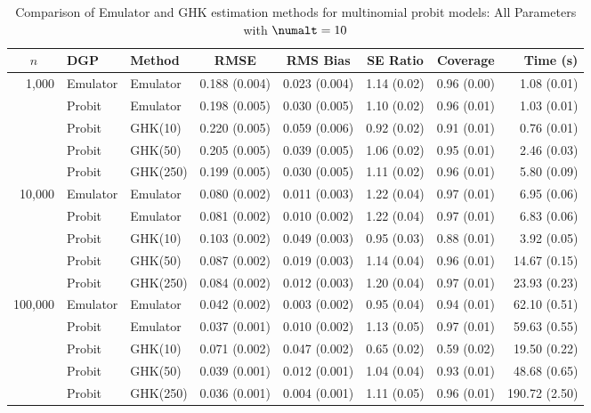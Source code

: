 \begin{table}[htbp]
\centering
\footnotesize
\begin{tabular}{@{}rllrrrrr@{}}
\toprule
\multicolumn{1}{c}{$n$} & \multicolumn{1}{l}{DGP} & \multicolumn{1}{l}{Method} & \multicolumn{1}{c}{RMSE} & \multicolumn{1}{c}{RMS Bias} & \multicolumn{1}{c}{SE Ratio} & \multicolumn{1}{c}{Coverage} & \multicolumn{1}{r}{Time (s)} \\
\midrule
\multirow{5}{*}{1,000} & Emulator & Emulator & 0.188 (0.004) & 0.023 (0.004) & 1.14 (0.02) & 0.96 (0.00) & 1.08 (0.01) \\
 & Probit & Emulator & 0.198 (0.005) & 0.030 (0.005) & 1.10 (0.02) & 0.96 (0.01) & 1.03 (0.01) \\
 & Probit & GHK(10) & 0.220 (0.005) & 0.059 (0.006) & 0.92 (0.02) & 0.91 (0.01) & 0.76 (0.01) \\
 & Probit & GHK(50) & 0.205 (0.005) & 0.039 (0.005) & 1.06 (0.02) & 0.95 (0.01) & 2.46 (0.03) \\
 & Probit & GHK(250) & 0.199 (0.005) & 0.030 (0.005) & 1.11 (0.02) & 0.96 (0.01) & 5.80 (0.09) \\
\midrule
\multirow{5}{*}{10,000} & Emulator & Emulator & 0.080 (0.002) & 0.011 (0.003) & 1.22 (0.04) & 0.97 (0.01) & 6.95 (0.06) \\
 & Probit & Emulator & 0.081 (0.002) & 0.010 (0.002) & 1.22 (0.04) & 0.97 (0.01) & 6.83 (0.06) \\
 & Probit & GHK(10) & 0.103 (0.002) & 0.049 (0.003) & 0.95 (0.03) & 0.88 (0.01) & 3.92 (0.05) \\
 & Probit & GHK(50) & 0.087 (0.002) & 0.019 (0.003) & 1.14 (0.04) & 0.96 (0.01) & 14.67 (0.15) \\
 & Probit & GHK(250) & 0.084 (0.002) & 0.012 (0.003) & 1.20 (0.04) & 0.97 (0.01) & 23.93 (0.23) \\
\midrule
\multirow{5}{*}{100,000} & Emulator & Emulator & 0.042 (0.002) & 0.003 (0.002) & 0.95 (0.04) & 0.94 (0.01) & 62.10 (0.51) \\
 & Probit & Emulator & 0.037 (0.001) & 0.010 (0.002) & 1.13 (0.05) & 0.97 (0.01) & 59.63 (0.55) \\
 & Probit & GHK(10) & 0.071 (0.002) & 0.047 (0.002) & 0.65 (0.02) & 0.59 (0.02) & 19.50 (0.22) \\
 & Probit & GHK(50) & 0.039 (0.001) & 0.012 (0.001) & 1.04 (0.04) & 0.93 (0.01) & 48.68 (0.65) \\
 & Probit & GHK(250) & 0.036 (0.001) & 0.004 (0.001) & 1.11 (0.05) & 0.96 (0.01) & 190.72 (2.50) \\
\bottomrule
\end{tabular}
\caption{Comparison of Emulator and GHK estimation methods for multinomial probit models: All Parameters with $\numalt=10$}
\label{tab:emulator_vs_ghk:10:all}
\end{table}